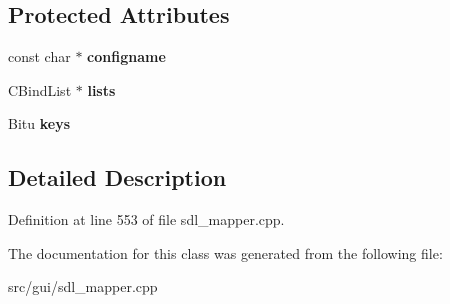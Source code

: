 \subsection*{Protected Attributes}
\begin{DoxyCompactItemize}
\item 
\hypertarget{classCKeyBindGroup_a7202ea1d9a5efdcda4f277d03e63ad63}{const char $\ast$ {\bfseries configname}}\label{classCKeyBindGroup_a7202ea1d9a5efdcda4f277d03e63ad63}

\item 
\hypertarget{classCKeyBindGroup_a915bc22f23540b1f8924adc831ba86ee}{C\-Bind\-List $\ast$ {\bfseries lists}}\label{classCKeyBindGroup_a915bc22f23540b1f8924adc831ba86ee}

\item 
\hypertarget{classCKeyBindGroup_a0d64ae014dfbdc463fea363dccd1bda6}{Bitu {\bfseries keys}}\label{classCKeyBindGroup_a0d64ae014dfbdc463fea363dccd1bda6}

\end{DoxyCompactItemize}


\subsection{Detailed Description}


Definition at line 553 of file sdl\-\_\-mapper.\-cpp.



The documentation for this class was generated from the following file\-:\begin{DoxyCompactItemize}
\item 
src/gui/sdl\-\_\-mapper.\-cpp\end{DoxyCompactItemize}
